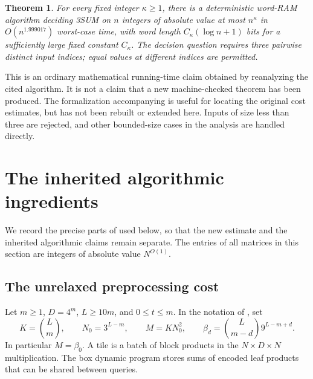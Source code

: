 \documentclass[11pt,a4paper]{article}
\newtheorem{theorem}{Theorem}[section]
\theoremstyle{remark}
\begin{document}
\begin{samepage}
\begin{theorem}\label{thm:main}
For every fixed integer $\kappa\geq 1$, there is a deterministic word-RAM
algorithm deciding 3SUM on $n$ integers of absolute value at most $n^\kappa$
in $O(n^{1.999017})$ worst-case time, with word length $C_\kappa(\log n+1)$
bits for a sufficiently large fixed constant $C_\kappa$.
The decision question requires three pairwise distinct input indices; equal
values at different indices are permitted.
\end{theorem}
\end{samepage}

This is an ordinary mathematical running-time claim obtained by reanalyzing
the cited algorithm. It is not a claim that a new machine-checked theorem has
been produced. The formalization accompanying \cite{AVW} is useful for locating
the original cost estimates, but has not been rebuilt or extended here.
Inputs of size less than three are rejected, and other bounded-size cases in
the analysis are handled directly.

\section{The inherited algorithmic ingredients}\label{sec:ingredients}

We record the precise parts of \cite{AVW} used below, so that the new estimate
and the inherited algorithmic claims remain separate. The entries of all
matrices in this section are integers of absolute value $N^{O(1)}$.

\subsection{The unrelaxed preprocessing cost}

Let $m\geq1$, $D=4^m$, $L\geq10m$, and $0\leq t\leq m$. In the notation of
\cite[Section 4]{AVW}, set
\begin{equation}\label{eq:counts}
 K=\binom Lm,\qquad N_0=3^{L-m},\qquad
 M=KN_0^2,\qquad
 \beta_d=\binom L{m-d}9^{L-m+d}.
\end{equation}
In particular $M=\beta_0$. A tile is a batch of block products in the
$N\times D\times N$ multiplication. The box dynamic program stores sums of
encoded leaf products that can be shared between queries.
\end{document}
